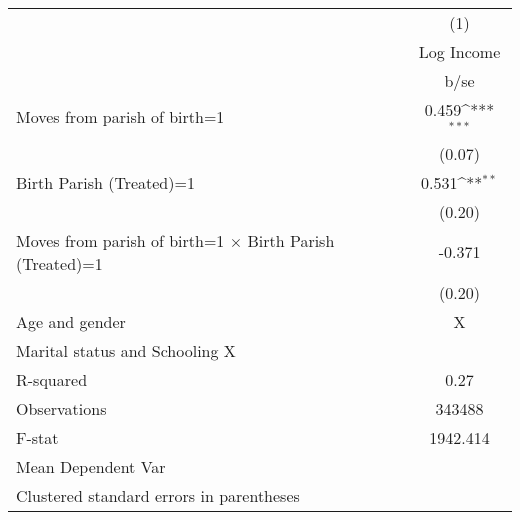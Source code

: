 {
\def\sym#1{\ifmmode^{#1}\else\(^{#1}\)\fi}
\begin{tabular}{l*{1}{c}}
\hline\hline
                    &\multicolumn{1}{c}{(1)}\\
                    &\multicolumn{1}{c}{Log Income}\\
                    &        b/se         \\
\hline
Moves from parish of birth=1&       0.459\sym{***}\\
                    &      (0.07)         \\
Birth Parish (Treated)=1&       0.531\sym{**} \\
                    &      (0.20)         \\
Moves from parish of birth=1 $\times$ Birth Parish (Treated)=1&      -0.371         \\
                    &      (0.20)         \\

\hline
                 
Age and gender                 &        X        \\
Marital status and Schooling             X     \\

\hline
R-squared           &        0.27         \\
Observations        &      343488         \\
F-stat              &    1942.414         \\
Mean Dependent Var  &                     \\
\hline\hline
\multicolumn{2}{l}{\footnotesize Clustered standard errors in parentheses}\\
\end{tabular}
}

